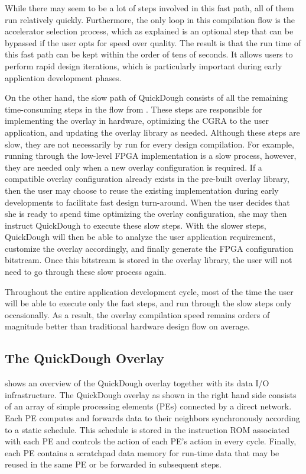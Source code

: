 While there may seem to be a lot of steps involved in this fast path, all of them run relatively quickly.
Furthermore, the only loop in this compilation flow is the accelerator selection process, which as explained is an optional step that can be bypassed if the user opts for speed over quality.
The result is that the run time of this fast path can be kept within the order of tens of seconds.
It allows users to perform rapid design iterations, which is particularly important during early application development phases.

On the other hand, the slow path of QuickDough consists of all the remaining time-consuming steps in the flow from .
These steps are responsible for implementing the overlay in hardware, optimizing the CGRA to the user application, and updating the overlay library as needed.
Although these steps are slow, they are not necessarily by run for every design compilation.
For example, running through the low-level FPGA implementation is a slow process, however, they are needed only when a new overlay configuration is required.
If a compatible overlay configuration already exists in the pre-built overlay library, then the user may choose to reuse the existing implementation during early developments to facilitate fast design turn-around.
When the user decides that she is ready to spend time optimizing the overlay configuration, she may then instruct QuickDough to execute these slow steps.  With the slower steps, QuickDough will then be able to analyze the user application requirement, customize the overlay accordingly, and finally generate the FPGA configuration bitstream.
Once this bitstream is stored in the overlay library, the user will not need to go through these slow process again.

Throughout the entire application development cycle, most of the time the user will be able to execute only the fast steps, and run through the slow steps only occasionally.
As a result, the overlay compilation speed remains orders of magnitude better than traditional hardware design flow on average.

\subsection{The QuickDough Overlay}
 shows an overview of the QuickDough overlay together with its data I/O infrastructure.
The QuickDough overlay as shown in the right hand side consists of an array of simple processing elements (PEs) connected by a direct network.
Each PE computes and forwards data to their neighbors synchronously according to a static schedule.
This schedule is stored in the instruction ROM associated with each PE and controls the action of each PE's action in every cycle.
Finally, each PE contains a scratchpad data memory for run-time data that may be reused in the same PE or be forwarded in subsequent steps.

